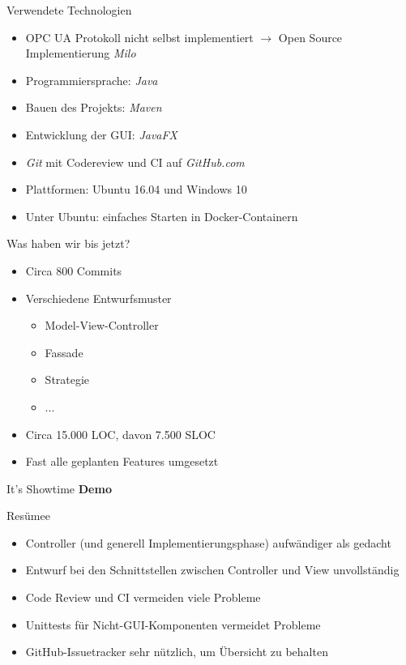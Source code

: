 \documentclass[22pt]{beamer}
\begin{document}
\begin{frame}{Verwendete Technologien}
\begin{itemize}[<+->]
 \item OPC UA Protokoll nicht selbst implementiert \newline
	   $\rightarrow$ Open Source Implementierung \emph{Milo}
 \item Programmiersprache: \emph{Java}
 \item Bauen des Projekts: \emph{Maven}
 \item Entwicklung der GUI: \emph{JavaFX}
 \item \emph{Git} mit Codereview und CI auf \emph{GitHub.com}
 \item Plattformen: Ubuntu 16.04 und Windows 10
 \item Unter Ubuntu: einfaches Starten in Docker-Containern
\end{itemize}
\end{frame}

\begin{frame}{Was haben wir bis jetzt?}
\begin{itemize}[<+->]
 \item Circa 800 Commits
 \item Verschiedene Entwurfsmuster
 \begin{itemize}
  \item Model-View-Controller
  \item Fassade
  \item Strategie
  \item ...
 \end{itemize}
 \item Circa 15.000 LOC, davon 7.500 SLOC
 \item Fast alle geplanten Features umgesetzt
\end{itemize}
\end{frame}

\begin{frame}{It's Showtime}
\centering
\huge
\textbf{Demo}
\end{frame}

\begin{frame}{Resümee}
\begin{itemize}[<+->]
 \item Controller (und generell Implementierungsphase) aufwändiger als gedacht
 \item Entwurf bei den Schnittstellen zwischen Controller und View unvollständig
 \item Code Review und CI vermeiden viele Probleme
 \item Unittests für Nicht-GUI-Komponenten vermeidet Probleme
 \item GitHub-Issuetracker sehr nützlich, um Übersicht zu behalten
\end{itemize}
\end{frame}
\end{document}
